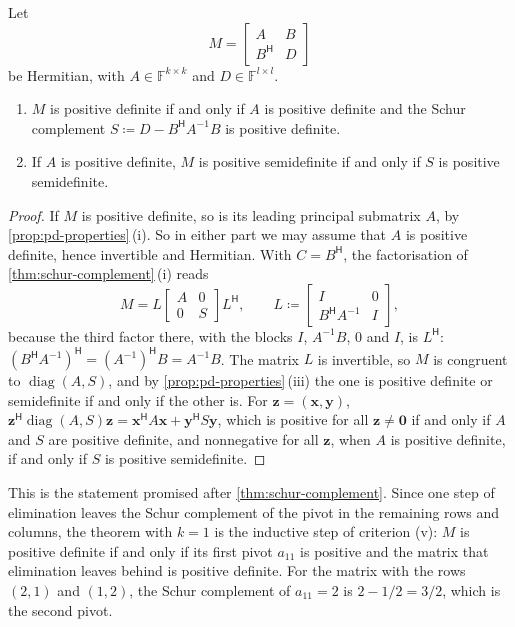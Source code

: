 \begin{theorem}
\label{thm:schur-pd}
Let
\[
M=\begin{bmatrix}A&B\\B^{\mathsf H}&D\end{bmatrix}
\]
be Hermitian, with $A\in\mathbb F^{k\times k}$ and $D\in\mathbb F^{l\times l}$.
\begin{enumerate}
\item $M$ is positive definite if and only if $A$ is positive definite and the Schur complement $S\coloneqq D-B^{\mathsf H}A^{-1}B$ is positive definite.
\item If $A$ is positive definite, $M$ is positive semidefinite if and only if $S$ is positive semidefinite.
\end{enumerate}
\end{theorem}

\begin{proof}
If $M$ is positive definite, so is its leading principal submatrix $A$, by \cref{prop:pd-properties}\,(i). So in either part we may assume that $A$ is positive definite, hence invertible and Hermitian. With $C=B^{\mathsf H}$, the factorisation of \cref{thm:schur-complement}\,(i) reads
\[
M=L\begin{bmatrix}A&0\\0&S\end{bmatrix}L^{\mathsf H},\qquad L\coloneqq\begin{bmatrix}I&0\\B^{\mathsf H}A^{-1}&I\end{bmatrix},
\]
because the third factor there, with the blocks $I$, $A^{-1}B$, $0$ and $I$, is $L^{\mathsf H}$: $(B^{\mathsf H}A^{-1})^{\mathsf H}=(A^{-1})^{\mathsf H}B=A^{-1}B$. The matrix $L$ is invertible, so $M$ is congruent to $\operatorname{diag}(A,S)$, and by \cref{prop:pd-properties}\,(iii) the one is positive definite or semidefinite if and only if the other is. For $\mathbf z=(\mathbf x,\mathbf y)$, $\mathbf z^{\mathsf H}\operatorname{diag}(A,S)\mathbf z=\mathbf x^{\mathsf H}A\mathbf x+\mathbf y^{\mathsf H}S\mathbf y$, which is positive for all $\mathbf z\ne\mathbf 0$ if and only if $A$ and $S$ are positive definite, and nonnegative for all $\mathbf z$, when $A$ is positive definite, if and only if $S$ is positive semidefinite.
\end{proof}

This is the statement promised after \cref{thm:schur-complement}. Since one step of elimination leaves the Schur complement of the pivot in the remaining rows and columns, the theorem with $k=1$ is the inductive step of criterion (v): $M$ is positive definite if and only if its first pivot $a_{11}$ is positive and the matrix that elimination leaves behind is positive definite. For the matrix with the rows $(2,1)$ and $(1,2)$, the Schur complement of $a_{11}=2$ is $2-1/2=3/2$, which is the second pivot.

